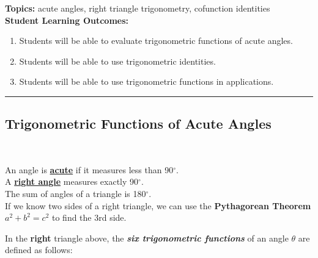 

\noindent \textbf{Topics:}  acute angles, right triangle trigonometry, cofunction identities\\

\noindent \textbf{Student Learning Outcomes:}
\begin{enumerate}
\item Students will be able to evaluate trigonometric functions of acute angles.
\item Students will be able to use trigonometric identities.
\item Students will be able to use trigonometric functions in applications.
\end{enumerate}

\hrule 

\bigskip

\subsection{Trigonometric Functions of Acute Angles} ~

\noindent An angle is \textbf{\underline{acute}} if it measures less than 90$^{\circ}$.\\
A \textbf{\underline{right angle}} measures exactly 90$^{\circ}$.\\
The sum of angles of a triangle is 180$^{\circ}$.\\[.2in]

\noindent If we know two sides of a right triangle, we can use the \textbf{Pythagorean Theorem} $a^2+b^2=c^2$ to find the 3rd side.

\begin{center}
\end{center}

In the \textbf{right} triangle above, the \textbf{\emph{six
    trigonometric functions}} of an angle $\theta$ are defined as
follows:

